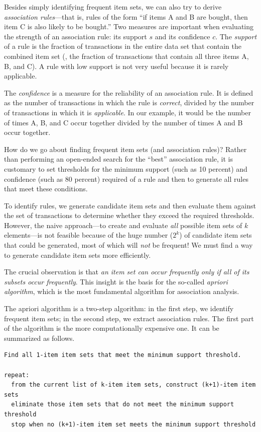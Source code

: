 Besides simply identifying frequent item sets, we can also try to
derive \emph{association rules}---that is, rules of the form ``if items
A and B are bought, then item C is also likely to be bought.'' Two
measures are important when evaluating the strength of an association
rule: its support $s$ and its confidence $c$. The \emph{support} of a
rule is the fraction of transactions in the entire data set that
contain the combined item set (\ie, the fraction of transactions that
contain all three items A, B, and C). A rule with low support is not
very useful because it is rarely applicable.

The \emph{confidence}  is a measure for the reliability of an
association rule. It is defined as the number of transactions in which
the rule is \emph{correct}, divided by the number of transactions in
which it is \emph{applicable}. In our example, it would be the number
of times A, B, and C occur together divided by the number of times A
and B occur together.

How do we go about finding frequent item sets (and association rules)?
Rather than performing an open-ended search for the ``best''
association rule, it is customary to set thresholds for the minimum
support (such as 10 percent) and confidence (such as 80 percent)
required of a rule and then to generate all rules that meet these
conditions.

To identify rules, we generate candidate item sets and then evaluate
them against the set of transactions to determine whether they exceed
the required thresholds. However, the naive approach---to create and
evaluate \emph{all} possible item sets of $k$ elements---is not
feasible because of the huge number ($2^k$) of candidate item sets
that could be generated, most of which will \emph{not} be frequent! We
must find a way to generate candidate item sets more efficiently.

The crucial observation is that \emph{an item set can occur
  frequently only if all of its subsets occur frequently}. This
insight is the basis for the so-called \emph{apriori algorithm}, which
is the most fundamental algorithm for association analysis. 

The apriori algorithm  is a two-step algorithm: in the first step, we
identify frequent item sets; in the second step, we extract association
rules. The first part of the algorithm is the more computationally
expensive one. It can be summarized as follows.

\begin{verbatim}
Find all 1-item item sets that meet the minimum support threshold.

repeat:
  from the current list of k-item item sets, construct (k+1)-item item sets
  eliminate those item sets that do not meet the minimum support threshold
  stop when no (k+1)-item item set meets the minimum support threshold
\end{verbatim}

